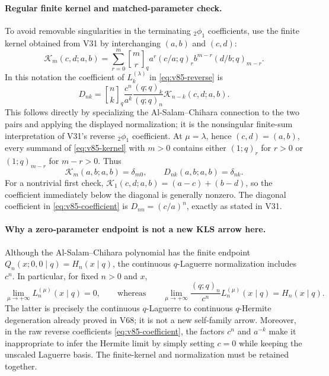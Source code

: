 \documentclass[11pt]{article}
\begin{document}
\paragraph{Regular finite kernel and matched-parameter check.}
To avoid removable singularities in the terminating ${}_2\phi_1$ coefficients, use the finite kernel obtained from V31 by interchanging $(a,b)$ and $(c,d)$:
\begin{equation}\label{eq:v85-kernel}
 \mathcal K_m(c,d;a,b)=\sum_{r=0}^{m}{m\brack r}_q
 a^r(c/a;q)_r b^{m-r}(d/b;q)_{m-r}.
\end{equation}
In this notation the coefficient of $L_k^{(\lambda)}$ in \eqref{eq:v85-reverse} is
\begin{equation}\label{eq:v85-coefficient}
 D_{nk}={n\brack k}_q\frac{c^n}{a^k}\frac{(q;q)_k}{(q;q)_n}
 \mathcal K_{n-k}(c,d;a,b).
\end{equation}
This follows directly by specializing the Al-Salam--Chihara connection to the two pairs and applying the displayed normalization; it is the nonsingular finite-sum interpretation of V31's reverse ${}_2\phi_1$ coefficient.
At $\mu=\lambda$, hence $(c,d)=(a,b)$, every summand of \eqref{eq:v85-kernel} with $m>0$ contains either $(1;q)_r$ for $r>0$ or $(1;q)_{m-r}$ for $m-r>0$. Thus
\[
 \mathcal K_m(a,b;a,b)=\delta_{m0},\qquad
 D_{nk}(a,b;a,b)=\delta_{nk}.
\]
For a nontrivial first check, $\mathcal K_1(c,d;a,b)=(a-c)+(b-d)$, so the coefficient immediately below the diagonal is generally nonzero. The diagonal coefficient in \eqref{eq:v85-coefficient} is $D_{nn}=(c/a)^n$, exactly as stated in V31.
\paragraph{Why a zero-parameter endpoint is not a new KLS arrow here.}
Although the Al-Salam--Chihara polynomial has the finite endpoint $Q_n(x;0,0\mid q)=H_n(x\mid q)$, the continuous $q$-Laguerre normalization includes $c^n$. In particular, for fixed $n>0$ and $x$,
\[
 \lim_{\mu\to+\infty}L_n^{(\mu)}(x\mid q)=0,
 \qquad\text{whereas}\qquad
 \lim_{\mu\to+\infty}\frac{(q;q)_n}{c^n}L_n^{(\mu)}(x\mid q)=H_n(x\mid q).
\]
The latter is precisely the continuous $q$-Laguerre to continuous $q$-Hermite degeneration already proved in V68; it is not a new self-family arrow. Moreover, in the raw reverse coefficients \eqref{eq:v85-coefficient}, the factors $c^n$ and $a^{-k}$ make it inappropriate to infer the Hermite limit by simply setting $c=0$ while keeping the unscaled Laguerre basis. The finite-kernel and normalization must be retained together.
\end{document}
